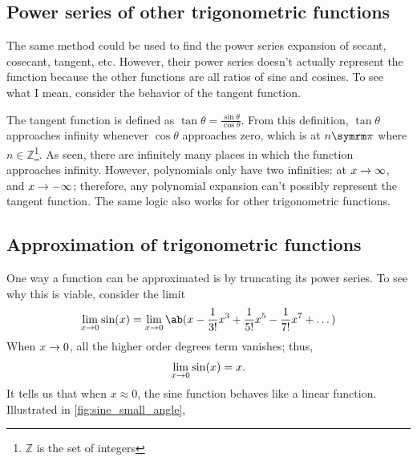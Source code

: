 \subsection{Power series of other trigonometric functions}

The same method could be used to find the power series expansion of secant, cosecant, tangent, etc. However, their power series doesn't actually represent the function because the other functions are all ratios of sine and cosines. To see what I mean, consider the behavior of the tangent function.

The tangent function is defined as \(\tan\theta = \frac{\sin\theta}{\cos\theta}\). From this definition, \(\tan\theta\) approaches infinity whenever \(\cos\theta\) approaches zero, which is at \(n\cpi\) where \(n \in \mathbb{Z}\)\footnote{\(\mathbb{Z}\) is the set of integers}. As seen, there are infinitely many places in which the function approaches infinity. However, polynomials only have two infinities: at \(x \rightarrow \infty\), and \(x \rightarrow -\infty\); therefore, any polynomial expansion can't possibly represent the tangent function. The same logic also works for other trigonometric functions.

\subsection{Approximation of trigonometric functions}

One way a function can be approximated is by truncating its power series. To see why this is viable, consider the limit
\begin{align}
  \lim_{x \appr 0}\sin(x) = \lim_{x \appr 0}\ab(x - \frac{1}{3!}x^3 + \frac{1}{5!}x^5 - \frac{1}{7!}x^7 + \dots)
\end{align}
When \(x \rightarrow 0\), all the higher order degrees term vanishes; thus,
\begin{gather}
  \lim_{x \rightarrow 0}\sin(x) = x.
\end{gather}
It tells us that when \(x \approx 0\), the sine function behaves like a linear function. Illustrated in \cref{fig:sine_small_angle},

